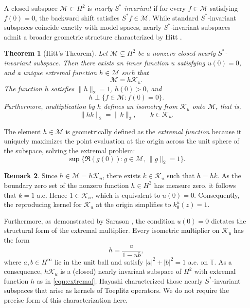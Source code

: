 \documentclass[12pt]{amsart}
\newtheorem{theorem}{Theorem}[section]
\theoremstyle{definition}
\newtheorem{remark}[theorem]{Remark}
\theoremstyle{remark}
\def \T{\mathbb{T}}
\newcommand{\clm}{\mathcal{M}}
\newcommand{\clk}{\mathcal{K}}
\numberwithin{equation}{section}
\begin{document}
A closed subspace $\clm \subset H^2$ is \emph{nearly $S^*$-invariant} if for every $f \in \clm$ satisfying $f(0) = 0$, the backward shift satisfies $S^* f \in \clm$. While standard $S^*$-invariant subspaces coincide exactly with model spaces, nearly $S^*$-invariant subspaces admit a broader geometric structure characterized by Hitt \cite{Hitt1988}.

\begin{theorem}[Hitt's Theorem]\cite{Hitt1988}\label{thm:hitt}
Let $\clm\subsetneq H^2$ be a nonzero closed nearly $S^*$-invariant subspace. Then there exists an inner function $u$ satisfying $u(0)=0$, and a unique extremal function $h\in\clm$ such that
\[
\clm=h\clk_u.
\]
The function $h$ satisfies $\|h\|_2=1$, $h(0)>0$, and
\[
h\perp\{f\in\clm:f(0)=0\}.
\]
Furthermore, multiplication by $h$ defines an isometry from $\clk_u$ onto $\clm$, that is,
\[
\|hk\|_2=\|k\|_2,\qquad k\in\clk_u.
\]
\end{theorem}

The element $h \in \clm$ is geometrically defined as the \emph{extremal function} because it uniquely maximizes the point evaluation at the origin across the unit sphere of the subspace, solving the extremal problem:
\begin{equation}\label{eqn:extremal}
\sup \{ \Re(g(0)) : g \in \clm, \, \|g\|_2 = 1 \}.
\end{equation}

\begin{remark}
Since $h\in\clm=h\clk_u$, there exists $k\in\clk_u$ such that $h=hk$. As the boundary zero set of the nonzero function $h\in H^2$ has measure zero, it follows that $k=1$ a.e. Hence $1\in\clk_u$, which is equivalent to $u(0)=0$. Consequently, the reproducing kernel for $\clk_u$ at the origin simplifies to $k_0^u(z) = 1$. 
    
Furthermore, as demonstrated by Sarason \cite{Sarason1987}, the condition $u(0) = 0$ dictates the structural form of the extremal multiplier. Every isometric multiplier on $\clk_u$ has the form
\[
h=\frac{a}{1-ub},
\]
where $a,b\in H^\infty$ lie in the unit ball and satisfy
$|a|^2+|b|^2=1$ a.e. on $\T$. As a consequence, $h\clk_u$ is a (closed) nearly invariant subspace of $H^2$ with extremal function $h$ as in \eqref{eqn:extremal}. Hayashi \cite{Hayashi1990} characterized those nearly
$S^*$-invariant subspaces that arise as kernels of Toeplitz operators. We do not require the precise form of this characterization here.
\end{remark}
\end{document}
